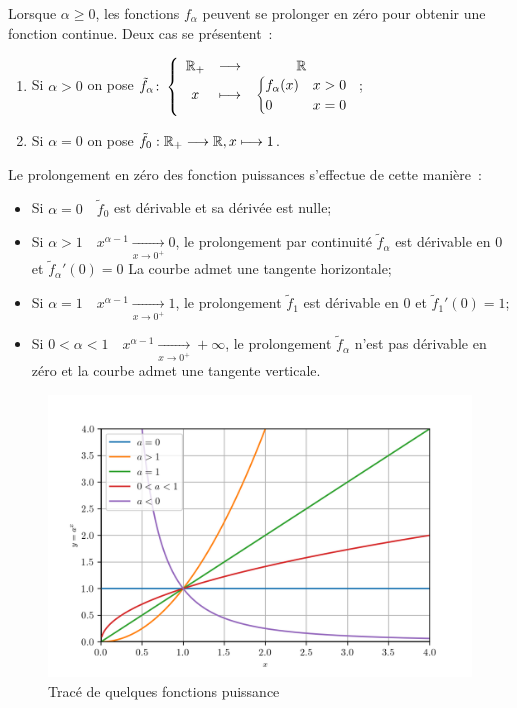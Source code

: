 Lorsque \(\alpha \geqslant 0\), les fonctions \(f_\alpha\) peuvent se prolonger 
en zéro pour obtenir une fonction continue. Deux cas se présentent~:
\begin{enumerate}
    \item Si \(\alpha>0\) on pose 
        \(\tilde{f}_\alpha\colon \left\{\begin{array}{ccc} \mathbb{R}_{+} & \longrightarrow &\mathbb{R}\\ x & \longmapsto & \begin{cases} f_\alpha(x) 
        & x>0 \\ 0 & x = 0 \end{cases} \end{array} \right.\);
    \item Si \(\alpha = 0\) on pose \(\tilde{f}_0:\mathbb{R}_{+} \longrightarrow \mathbb{R}, x \longmapsto 1\).
\end{enumerate}

Le prolongement en zéro des fonction puissances s'effectue de cette manière~:
\begin{itemize}
    \item Si \(\alpha = 0 \quad \tilde{f}_0\) est dérivable et sa 
        dérivée est nulle;
    \item Si \(\alpha>1 \quad x^{\alpha-1}\underset{x \to 
        0^+}{\longrightarrow}0\), le prolongement par continuité 
        \(\tilde{f}_\alpha\) est dérivable en 0 et 
        \(\tilde{f}_\alpha'(0) = 0\) La courbe admet une tangente 
        horizontale;
    \item Si \(\alpha = 1 \quad x^{\alpha-1}\underset{x \to 
        0^+}{\longrightarrow}1\), le prolongement  \(\tilde{f}_1\) 
        est dérivable en 0 et \(\tilde{f}_1'(0) = 1\);
    \item Si \(0<\alpha<1 \quad x^{\alpha-1}\underset{x \to 
        0^+}{\longrightarrow}+\infty \), le prolongement 
        \(\tilde{f}_\alpha\) n'est pas dérivable en zéro et la 
        courbe admet une tangente verticale.
\end{itemize}

\begin{figure}
    \centering
    \includegraphics[scale = 1.0]{puiss.png}
    \caption{Tracé de quelques fonctions puissance}
    \label{figtracepuissance}
\end{figure}

